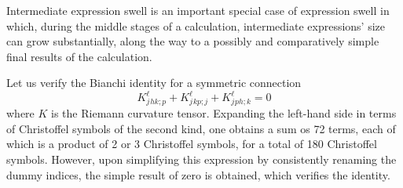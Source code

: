 Intermediate expression swell is an important special case of expression swell in which, during the middle stages of a calculation, intermediate expressions' size can grow substantially, along the way to a possibly and comparatively simple final results of the calculation.
%
\begin{example}
  Let us verify the Bianchi identity for a symmetric connection
  \begin{equation*}
    K^{\ell}_{j}{}_{hk;p} + K^{\ell}_{j}{}_{kp;j} + K^{\ell}_{j}{}_{ph;k} = 0
  \end{equation*}
  where $K$ is the Riemann curvature tensor. Expanding the left-hand side in terms of Christoffel symbols of the second kind, one obtains a sum os 72 terms, each of which is a product of 2 or 3 Christoffel symbols, for a total of 180 Christoffel symbols. However, upon simplifying this expression by consistently renaming the dummy indices, the simple result of zero is obtained, which verifies the identity.

\end{example}
